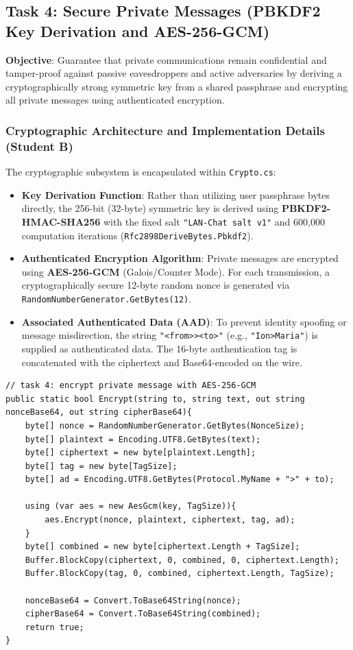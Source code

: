 \documentclass[11pt,a4paper]{article}
\begin{document}
\subsection{Task 4: Secure Private Messages (PBKDF2 Key Derivation and AES-256-GCM)}
\textbf{Objective}: Guarantee that private communications remain confidential and tamper-proof against passive eavesdroppers and active adversaries by deriving a cryptographically strong symmetric key from a shared passphrase and encrypting all private messages using authenticated encryption.

\subsubsection{Cryptographic Architecture and Implementation Details (Student B)}
The cryptographic subsystem is encapsulated within \texttt{Crypto.cs}:
\begin{itemize}
    \item \textbf{Key Derivation Function}: Rather than utilizing user passphrase bytes directly, the 256-bit (32-byte) symmetric key is derived using \textbf{PBKDF2-HMAC-SHA256} with the fixed salt \texttt{"LAN-Chat salt v1"} and 600,000 computation iterations (\texttt{Rfc2898DeriveBytes.Pbkdf2}).
    \item \textbf{Authenticated Encryption Algorithm}: Private messages are encrypted using \textbf{AES-256-GCM} (Galois/Counter Mode). For each transmission, a cryptographically secure 12-byte random nonce is generated via \texttt{RandomNumberGenerator.GetBytes(12)}.
    \item \textbf{Associated Authenticated Data (AAD)}: To prevent identity spoofing or message misdirection, the string \texttt{"<from>><to>"} (e.g., \texttt{"Ion>Maria"}) is supplied as authenticated data. The 16-byte authentication tag is concatenated with the ciphertext and Base64-encoded on the wire.
\end{itemize}

\begin{lstlisting}[language={[Sharp]C}, caption={Task 4: AES-256-GCM authenticated encryption and decryption in Crypto.cs.}]
// task 4: encrypt private message with AES-256-GCM
public static bool Encrypt(string to, string text, out string nonceBase64, out string cipherBase64){
    byte[] nonce = RandomNumberGenerator.GetBytes(NonceSize);
    byte[] plaintext = Encoding.UTF8.GetBytes(text);
    byte[] ciphertext = new byte[plaintext.Length];
    byte[] tag = new byte[TagSize];
    byte[] ad = Encoding.UTF8.GetBytes(Protocol.MyName + ">" + to);

    using (var aes = new AesGcm(key, TagSize)){
        aes.Encrypt(nonce, plaintext, ciphertext, tag, ad);
    }
    byte[] combined = new byte[ciphertext.Length + TagSize];
    Buffer.BlockCopy(ciphertext, 0, combined, 0, ciphertext.Length);
    Buffer.BlockCopy(tag, 0, combined, ciphertext.Length, TagSize);

    nonceBase64 = Convert.ToBase64String(nonce);
    cipherBase64 = Convert.ToBase64String(combined);
    return true;
}
\end{lstlisting}
\end{document}
